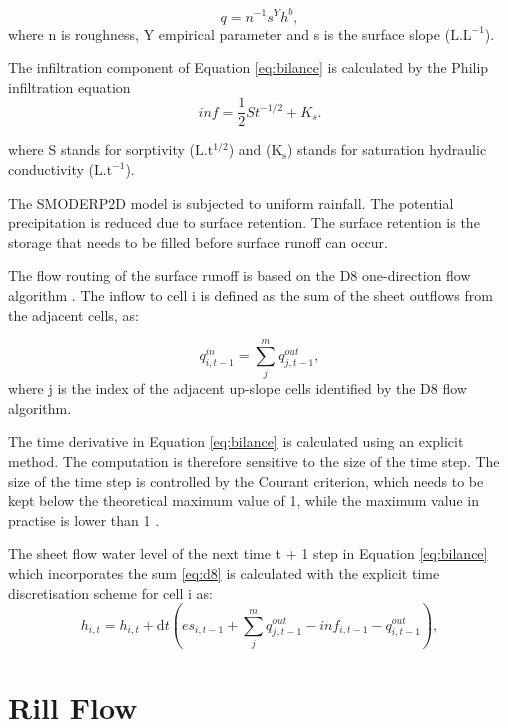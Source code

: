 \begin{equation} 
q = n^{-1} s^Y h^b,
\label{eq:powerlaw}
\end{equation}
where n is roughness,  Y  empirical parameter and s is the surface slope ($\mathrm{L.L^{-1}}$).

The infiltration component of Equation \ref{eq:bilance} is calculated by the
Philip infiltration equation \citep{philip1957}
\begin{equation} 
inf = \frac{1}{2}St^{-1/2}+K_s.
\label{eq:infiltration}
\end{equation} 

where S stands for sorptivity ($\mathrm{L.t^{1/2}}$) and ($\mathrm{K_s}$)
stands for saturation hydraulic conductivity ($\mathrm{L.t^{-1}}$).

The SMODERP2D model is subjected to uniform rainfall. The potential
precipitation is reduced due to surface retention. The surface retention is the
storage that needs to be filled before surface runoff can occur. 

The flow routing of the surface runoff is based on the D8 one-direction flow
algorithm \cite{o1984extraction}. The inflow to cell i is defined as the sum of the sheet
outflows from the adjacent cells, as:

\begin{equation} 
q^{in}_{i,t-1} = \sum_j^m q^{out}_{j,t-1}, 
\label{eq:d8}
\end{equation} 
where j is the index of the adjacent up-slope cells identified by the D8 flow
algorithm.

The time derivative in Equation \ref{eq:bilance} is calculated using an
explicit method. The computation is therefore sensitive to the size of the time
step. The size of the time step is controlled by the Courant criterion, which
needs to be kept below the theoretical maximum value of 1, while the maximum
value in practise is lower than 1 
\cite{zhang1989modeling, esteves2000overland}.


The sheet flow water level of the next time t + 1 step in Equation
\ref{eq:bilance} which incorporates the sum \ref{eq:d8} is calculated with the
explicit time discretisation scheme for cell i as:
\begin{equation} 
h_{i,t} =h_{i,t} + \mathrm{d}t (es_{i,t-1} + \sum_j^m q^{out}_{j,t-1}-
inf_{i,t-1} - q^{out}_{i,t-1}),
\label{eq:bilance}
\end{equation}

\section{Rill Flow}

